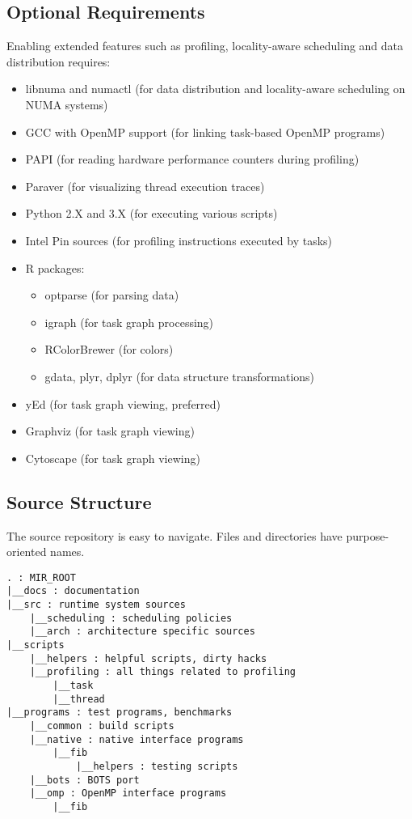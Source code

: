 \documentclass[11pt,a4paper]{article}
\begin{document}
\subsection{Optional Requirements}\label{optional-requirements}

Enabling extended features such as profiling, locality-aware scheduling
and data distribution requires:

\begin{itemize}
\item libnuma and numactl (for data distribution and locality-aware scheduling on NUMA systems)
\item GCC with OpenMP support (for linking task-based OpenMP programs)
\item PAPI (for reading hardware performance counters during profiling)
\item Paraver (for visualizing thread execution traces)
\item Python 2.X and 3.X (for executing various scripts)
\item Intel Pin sources (for profiling instructions executed by tasks)
\item R packages:
  \begin{itemize}
  \item optparse (for parsing data)
  \item igraph (for task graph processing)
  \item RColorBrewer (for colors)
  \item gdata, plyr, dplyr (for data structure transformations)
  \end{itemize}
\item yEd (for task graph viewing, preferred)
\item Graphviz (for task graph viewing)
\item Cytoscape (for task graph viewing)
\end{itemize}

\subsection{Source Structure}\label{source-structure}

The source repository is easy to navigate. Files and directories have purpose-oriented names.

\begin{lstlisting}[style=MyInputStyle]
. : MIR_ROOT
|__docs : documentation
|__src : runtime system sources
    |__scheduling : scheduling policies
    |__arch : architecture specific sources
|__scripts
    |__helpers : helpful scripts, dirty hacks
    |__profiling : all things related to profiling
        |__task
        |__thread
|__programs : test programs, benchmarks
    |__common : build scripts
    |__native : native interface programs
        |__fib
            |__helpers : testing scripts
    |__bots : BOTS port
    |__omp : OpenMP interface programs
        |__fib
\end{lstlisting}
\end{document}
